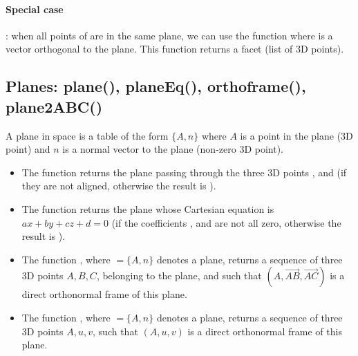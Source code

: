 \paragraph{Special case}: when all points of  are in the same plane, we can use the function  where  is a vector orthogonal to the plane. This function returns a facet (list of 3D points).

\subsection{Planes: plane(), planeEq(), orthoframe(), plane2ABC()}

A plane in space is a table of the form $\{A,n\}$ where $A$ is a point in the plane (3D point) and $n$ is a normal vector to the plane (non-zero 3D point).
\begin{itemize}
    \item The function  returns the plane passing through the three 3D points ,  and  (if they are not aligned, otherwise the result is \nil).

    \item The function  returns the plane whose Cartesian equation is $ax+by+cz+d=0$ (if the coefficients ,  and  are not all zero, otherwise the result is \nil).

    \item The function , where $=\{A,n\}$ denotes a plane, returns a sequence of three 3D points $A,B,C$, belonging to the plane, and such that $(A,\vec{AB},\vec{AC})$ is a direct orthonormal frame of this plane.

    \item The function , where $=\{A,n\}$ denotes a plane, returns a sequence of three 3D points $A,u,v$, such that $(A,u,v)$ is a direct orthonormal frame of this plane.
\end{itemize}

